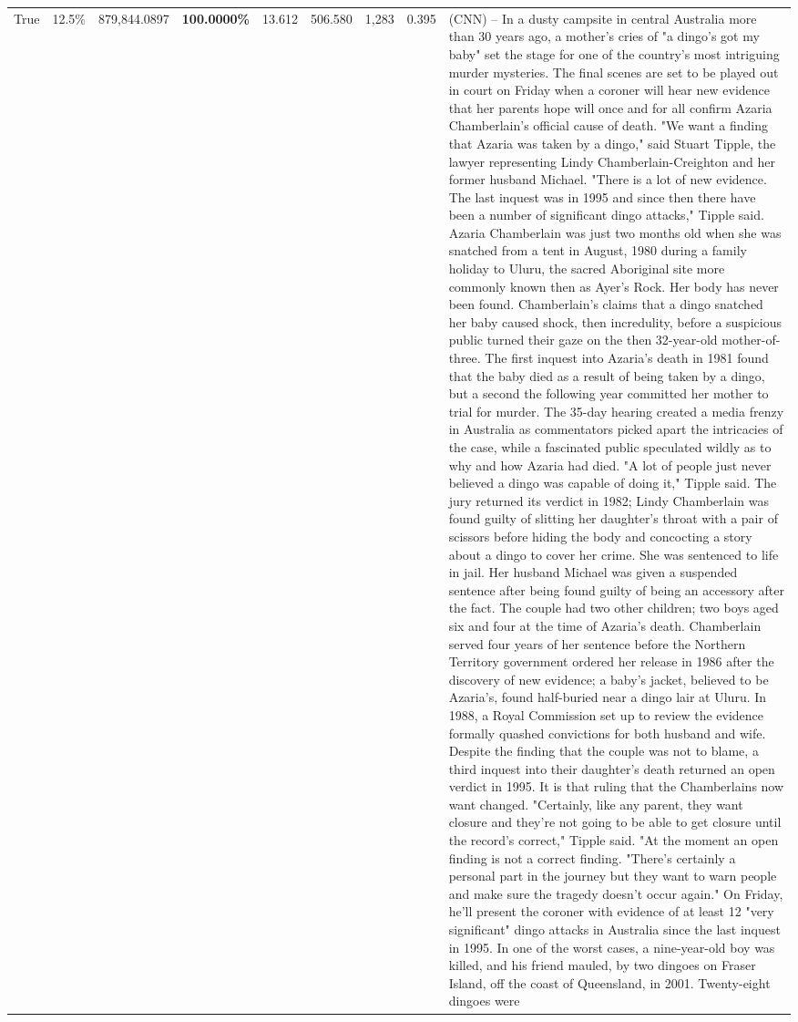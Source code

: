 \begin{table}[H]
\begin{tabular}{lllrlllll}
True & 12.5\% & 879,844.0897 & \bfseries \color{red} 100.0000\% & 13.612 & 506.580 & 1,283 & 0.395 & (CNN) -- In a dusty campsite in central Australia more than 30 years ago, a mother's cries of "a dingo's got my baby" set the stage for one of the country's most intriguing murder mysteries. The final scenes are set to be played out in court on Friday when a coroner will hear new evidence that her parents hope will once and for all confirm Azaria Chamberlain's official cause of death. "We want a finding that Azaria was taken by a dingo," said Stuart Tipple, the lawyer representing Lindy Chamberlain-Creighton and her former husband Michael. "There is a lot of new evidence. The last inquest was in 1995 and since then there have been a number of significant dingo attacks," Tipple said. Azaria Chamberlain was just two months old when she was snatched from a tent in August, 1980 during a family holiday to Uluru, the sacred Aboriginal site more commonly known then as Ayer's Rock. Her body has never been found. Chamberlain's claims that a dingo snatched her baby caused shock, then incredulity, before a suspicious public turned their gaze on the then 32-year-old mother-of-three. The first inquest into Azaria's death in 1981 found that the baby died as a result of being taken by a dingo, but a second the following year committed her mother to trial for murder. The 35-day hearing created a media frenzy in Australia as commentators picked apart the intricacies of the case, while a fascinated public speculated wildly as to why and how Azaria had died. "A lot of people just never believed a dingo was capable of doing it," Tipple said. The jury returned its verdict in 1982; Lindy Chamberlain was found guilty of slitting her daughter's throat with a pair of scissors before hiding the body and concocting a story about a dingo to cover her crime. She was sentenced to life in jail. Her husband Michael was given a suspended sentence after being found guilty of being an accessory after the fact. The couple had two other children; two boys aged six and four at the time of Azaria's death. Chamberlain served four years of her sentence before the Northern Territory government ordered her release in 1986 after the discovery of new evidence; a baby's jacket, believed to be Azaria's, found half-buried near a dingo lair at Uluru. In 1988, a Royal Commission set up to review the evidence formally quashed convictions for both husband and wife. Despite the finding that the couple was not to blame, a third inquest into their daughter's death returned an open verdict in 1995. It is that ruling that the Chamberlains now want changed. "Certainly, like any parent, they want closure and they're not going to be able to get closure until the record's correct," Tipple said. "At the moment an open finding is not a correct finding. "There's certainly a personal part in the journey but they want to warn people and make sure the tragedy doesn't occur again." On Friday, he'll present the coroner with evidence of at least 12 "very significant" dingo attacks in Australia since the last inquest in 1995. In one of the worst cases, a nine-year-old boy was killed, and his friend mauled, by two dingoes on Fraser Island, off the coast of Queensland, in 2001. Twenty-eight dingoes were 
\end{tabular}
\end{table}
